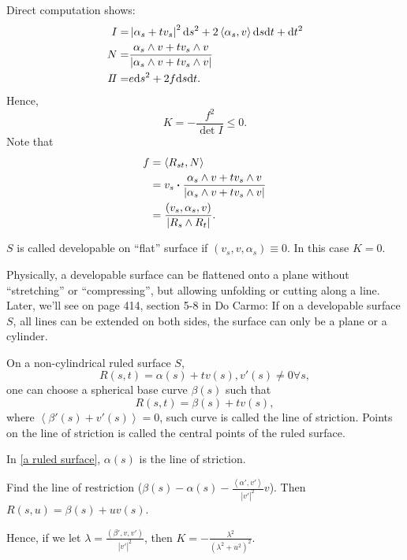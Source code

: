 Direct computation shows:
\begin{align*}
    I=&\left|\alpha_s+t v_s\right|^2\dd s^2+2\left\langle
        \alpha_s,v
    \right\rangle \dd s\dd t
    +\dd t^2\\
    N=&\frac{\alpha_s\wedge v+t v_s \wedge v}{
        \left|\alpha_s\wedge v+t v_s \wedge v\right|
    }\\
    I\!I=&e\dd s^2+2f \dd s \dd t .
\end{align*}
Hence,
\[
    K=-\frac{f^2}{\det I}\le 0.    
\]
Note that 
\begin{align*}
    f&=\left\langle R_{st},N\right\rangle\\
    &=v_s\vdot \frac{\alpha_s\wedge v+t v_s \wedge v}{
        \left|\alpha_s\wedge v+t v_s \wedge v\right|
    }\\
    &=\frac{\left(v_s,\alpha_s,v\right)}{\left|R_s\wedge R_t\right|}.
\end{align*}
\begin{definition}
    \(S\) is called developable on ``flat'' surface if \(\left(
        v_s,v,\alpha_s
    \right)\equiv 0\). In this case \(K=0\).
\end{definition}
\begin{remark}
    Physically, a developable surface can be flattened onto a plane 
    without ``stretching'' or ``compressing'', but allowing unfolding
    or cutting along a line. Later, we'll see on page 414, section 5-8
    in Do Carmo: If on a developable surface \(S\), all lines can be 
    extended on both sides, the surface can only be a plane 
    or a cylinder.
\end{remark}
\begin{remark}
    On a non-cylindrical ruled surface \(S\), \ie\ 
    \[R(s,t)=\alpha(s)+t v(s),v'(s)\neq 0\forall s,\]
    one can choose a spherical base curve \(\beta(s)\) such
    that 
    \[
        R(s,t)=\beta(s)+t v(s),    
    \]
    where \(\left\langle\beta'(s)+v'(s)\right\rangle=0\),
     such curve is called the line of striction. Points on the line
      of striction is called the central points of the ruled surface.
\end{remark}
\begin{example}
    In \cref{a ruled surface}, \(\alpha(s)\) is the line of striction.
\end{example}
\begin{exercise}
    Find the line of restriction (\(\beta(s)-\alpha(s)
    -\frac{\left\langle\alpha',v'\right\rangle}{|v'|^2}v\)).
    Then \(R(s,u)=\beta(s)+u v(s)\).

    Hence, if we let \(\lambda=\frac{(\beta',v,v')}{|v'|^2}\), then 
    \(K=-\frac{\lambda^2}{\left(\lambda^2+u^2\right)^2}\).
\end{exercise}
